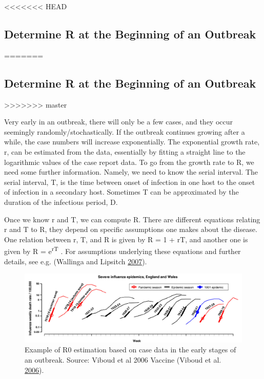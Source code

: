 \documentclass[]{book}
\theoremstyle{definition}
\theoremstyle{definition}
\theoremstyle{definition}
\theoremstyle{remark}
\begin{document}
<<<<<<< HEAD
\hypertarget{determine-r-at-the-beginning-of-an-outbreak}{%
\subsection{Determine R at the Beginning of an
Outbreak}\label{determine-r-at-the-beginning-of-an-outbreak}}
=======
\subsection{Determine R at the Beginning of an
Outbreak}\label{determine-r-at-the-beginning-of-an-outbreak}
>>>>>>> master

Very early in an outbreak, there will only be a few cases, and they
occur seemingly randomly/stochastically. If the outbreak continues
growing after a while, the case numbers will increase exponentially. The
exponential growth rate, r, can be estimated from the data, essentially
by fitting a straight line to the logarithmic values of the case report
data. To go from the growth rate to R, we need some further information.
Namely, we need to know the serial interval. The serial interval, T, is
the time between onset of infection in one host to the onset of
infection in a secondary host. Sometimes T can be approximated by the
duration of the infectious period, D.

Once we know r and T, we can compute R. There are different equations
relating r and T to R, they depend on specific assumptions one makes
about the disease. One relation between r, T, and R is given by R = 1 +
rT, and another one is given by R = e\textsuperscript{rT} . For
assumptions underlying these equations and further details, see e.g.
(Wallinga and Lipsitch \protect\hyperlink{ref-wallinga07}{2007}).

\begin{figure}
\centering
\includegraphics{./images/viboud-R0.png}
\caption{\label{fig:viboudR0}Example of R0 estimation based on case data in
the early stages of an outbreak. Source: Viboud et al 2006 Vaccine
(Viboud et al. \protect\hyperlink{ref-viboud06}{2006}).}
\end{figure}
\end{document}
